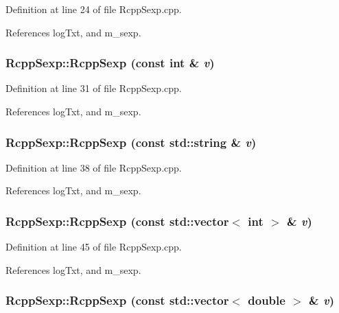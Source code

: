 Definition at line 24 of file RcppSexp.cpp.

References logTxt, and m\_\-sexp.\hypertarget{classRcppSexp_a2ddf3900d04a52a59e15faebe83a4e8b}{
\subsubsection[{RcppSexp}]{\setlength{\rightskip}{0pt plus 5cm}RcppSexp::RcppSexp (const int \& {\em v})}}
\label{classRcppSexp_a2ddf3900d04a52a59e15faebe83a4e8b}


Definition at line 31 of file RcppSexp.cpp.

References logTxt, and m\_\-sexp.\hypertarget{classRcppSexp_a0876ffb6bdb82d6fe2f30a6a73d51dbb}{
\subsubsection[{RcppSexp}]{\setlength{\rightskip}{0pt plus 5cm}RcppSexp::RcppSexp (const std::string \& {\em v})}}
\label{classRcppSexp_a0876ffb6bdb82d6fe2f30a6a73d51dbb}


Definition at line 38 of file RcppSexp.cpp.

References logTxt, and m\_\-sexp.\hypertarget{classRcppSexp_ab276f77e2cc03da2d60d8826d095d757}{
\subsubsection[{RcppSexp}]{\setlength{\rightskip}{0pt plus 5cm}RcppSexp::RcppSexp (const std::vector$<$ int $>$ \& {\em v})}}
\label{classRcppSexp_ab276f77e2cc03da2d60d8826d095d757}


Definition at line 45 of file RcppSexp.cpp.

References logTxt, and m\_\-sexp.\hypertarget{classRcppSexp_addfe0bf529d5adc8cfd3729035676cf1}{
\subsubsection[{RcppSexp}]{\setlength{\rightskip}{0pt plus 5cm}RcppSexp::RcppSexp (const std::vector$<$ double $>$ \& {\em v})}}
\label{classRcppSexp_addfe0bf529d5adc8cfd3729035676cf1}


